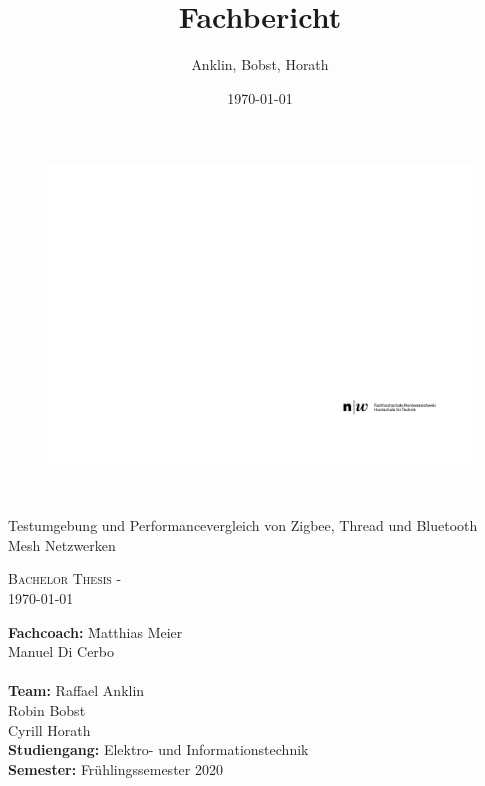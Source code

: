 \documentclass[final]{fhnwreport}       %
\title{Fachbericht}  		        %
\author{Anklin, Bobst, Horath}      				    %
\date{\today}          				   %
\begin{document}
\thispagestyle{empty}
	\begin{figure}
		 \vspace*{-\topskip}\vspace*{-\headsep}
		\includegraphics[scale=1]{graphics/fhnw_ht_logo_de.pdf}
	\end{figure}
	\begin{center}
		\vspace*{2cm}
		{\huge{\textbf{\thetitle}}}\\
		\vspace*{1cm}
		
		{\huge{Testumgebung und Performancevergleich von Zigbee, Thread und Bluetooth Mesh Netzwerken}}\\
		\vspace*{0.5cm}
		
		{\scshape\Large Bachelor Thesis - \theauthor \\} \Large{\today}
		\vfill
		
		
		\begin{normalsize}
			{\begin{tabbing}
						
					\textbf{Fachcoach:} \hspace{6cm}\= Matthias Meier\\
					\>Manuel Di Cerbo\\
					
					\\[0.4cm]
					
					\textbf{Team:} \>Raffael Anklin \\ \>Robin Bobst \\ \>Cyrill Horath
					\\[0.8cm]
					\textbf{Studiengang:} \>Elektro- und Informationstechnik
					\\[0.8cm]	\textbf{Semester:} \>Frühlingssemester 2020
			\end{tabbing}}
		\end{normalsize}
		\vfill
	\end{center}
\clearpage
\end{document}
